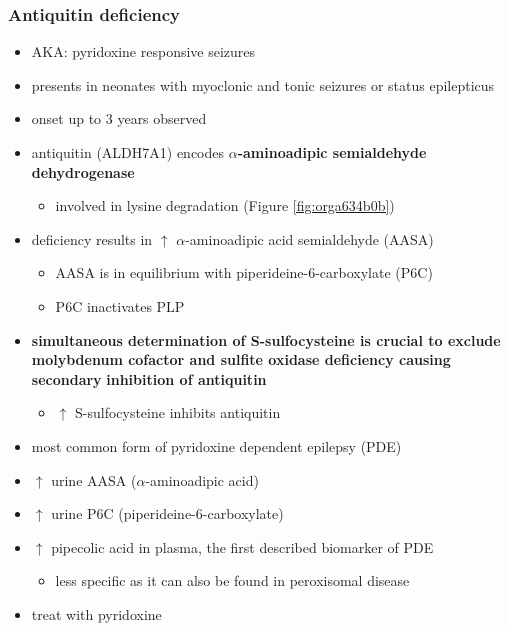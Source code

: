 \documentclass[12pt]{scrartcl}
\begin{document}
\subsubsection{Antiquitin deficiency}
\label{sec:org5c36064}
\begin{itemize}
\item AKA: pyridoxine responsive seizures
\item presents in neonates with myoclonic and tonic seizures or
status epilepticus
\item onset up to 3 years observed
\item antiquitin (ALDH7A1) encodes \textbf{\(\alpha\)-aminoadipic semialdehyde dehydrogenase}
\begin{itemize}
\item involved in lysine degradation (Figure \ref{fig:orga634b0b})
\end{itemize}
\end{itemize}
\begin{itemize}
\item deficiency results in \(\uparrow\) \(\alpha\)-aminoadipic acid semialdehyde (AASA)
\begin{itemize}
\item AASA is in equilibrium with piperideine-6-carboxylate (P6C)
\item P6C inactivates PLP
\end{itemize}
\end{itemize}
\begin{itemize}
\item \textbf{simultaneous determination of S-sulfocysteine is crucial to exclude}
\textbf{molybdenum cofactor and sulfite oxidase deficiency causing secondary}
\textbf{inhibition of antiquitin}
\begin{itemize}
\item \(\uparrow\) S-sulfocysteine inhibits antiquitin
\end{itemize}
\item most common form of pyridoxine dependent epilepsy (PDE)
\item \(\uparrow\) urine AASA (\(\alpha\)-aminoadipic acid)
\item \(\uparrow\) urine P6C (piperideine-6-carboxylate)
\item \(\uparrow\) pipecolic acid in plasma, the first described biomarker of PDE
\begin{itemize}
\item less specific as it can also be found in peroxisomal disease
\end{itemize}
\item treat with pyridoxine
\end{itemize}
\end{document}
